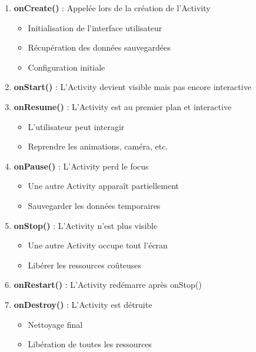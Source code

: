 \documentclass[11pt,a4paper]{article}
\begin{document}
\begin{enumerate}
    \item \textbf{onCreate()} : Appelée lors de la création de l'Activity
    \begin{itemize}
        \item Initialisation de l'interface utilisateur
        \item Récupération des données sauvegardées
        \item Configuration initiale
    \end{itemize}
    
    \item \textbf{onStart()} : L'Activity devient visible mais pas encore interactive
    
    \item \textbf{onResume()} : L'Activity est au premier plan et interactive
    \begin{itemize}
        \item L'utilisateur peut interagir
        \item Reprendre les animations, caméra, etc.
    \end{itemize}
    
    \item \textbf{onPause()} : L'Activity perd le focus
    \begin{itemize}
        \item Une autre Activity apparaît partiellement
        \item Sauvegarder les données temporaires
    \end{itemize}
    
    \item \textbf{onStop()} : L'Activity n'est plus visible
    \begin{itemize}
        \item Une autre Activity occupe tout l'écran
        \item Libérer les ressources coûteuses
    \end{itemize}
    
    \item \textbf{onRestart()} : L'Activity redémarre après onStop()
    
    \item \textbf{onDestroy()} : L'Activity est détruite
    \begin{itemize}
        \item Nettoyage final
        \item Libération de toutes les ressources
    \end{itemize}
\end{enumerate}
\end{document}
